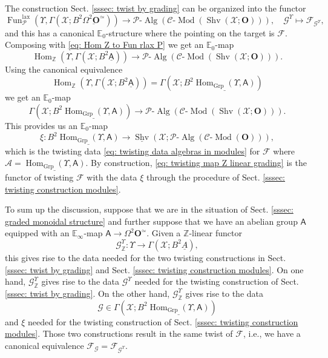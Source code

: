 \documentclass[10pt]{amsart}
\theoremstyle{remark}
\newcommand{\ul}{\underline}
\newcommand{\E}{\mathbb{E}}
\newcommand{\Z}{\mathbb{Z}}
\newcommand{\cP}{\mathcal{P}}
\newcommand{\on}{\operatorname}
\newcommand{\cA}{\mathcal{A}}
\newcommand{\cC}{\mathcal{C}}
\newcommand{\cF}{\mathcal{F}}
\newcommand{\cG}{\mathcal{G}}
\newcommand{\cX}{\mathcal{X}}
\newcommand{\lMod}{\text{-}\on{Mod}}
\newcommand{\lAlg}{\text{-}\on{Alg}}
\newcommand{\Shv}{\on{Shv}}
\DeclareMathOperator{\Hom}{Hom}
\newcommand{\Fun}{\on{Fun}}
\newcommand{\bO}{\mathbf{O}}
\newcommand{\sfA}{\mathsf{A}}
\begin{document}
The construction Sect. \ref{sssec: twist by grading} can be organized into the functor
\[\Fun^{\on{lax}}_{\cP}(\Upsilon, \Gamma(\cX;B^2\ul{\Omega^2\bO^{\simeq}}))\rightarrow \cP\lAlg\left(\cC\lMod\left(\Shv(\cX;\bO)\right)\right),\quad \cG^{\Upsilon}\mapsto \cF_{\cG^{\Upsilon}},\]
and this has a canonical $\E_0$-structure where the pointing on the target is $\cF$. Composing with \eqref{eq: Hom Z to Fun rlax P} we get an $\E_0$-map
\[\Hom_{\Z}(\Upsilon,\Gamma(\cX;B^2\ul{\sfA}))\rightarrow \cP\lAlg\left(\cC\lMod\left(\Shv(\cX;\bO)\right)\right).\]
Using the canonical equivalence
\[\Hom_{\Z}(\Upsilon,\Gamma(\cX; B^2\ul{\sfA}))=\Gamma(\cX;B^2\ul{\Hom_{\on{Grp}}(\Upsilon,\sfA)})\]
we get an $\E_0$-map
\begin{equation}\label{eq: twisting map Z linear grading}
    \Gamma(\cX;B^2\ul{\Hom_{\on{Grp}}(\Upsilon,\sfA)})\rightarrow \cP\lAlg\left(\cC\lMod\left(\Shv(\cX;\bO)\right)\right).
\end{equation}
This provides us an $\E_0$-map
\begin{equation*}
    \xi: B^2\ul{\Hom_{\on{Grp}}(\Upsilon,\sfA)}\rightarrow\ul{\Shv}\left(\cX;\cP\lAlg\left(\cC\lMod(\bO)\right)\right),
\end{equation*}
which is the twisting data \eqref{eq: twisting data algebras in modules} for $\cF$ where $\cA=\ul{\Hom_{\on{Grp}}(\Upsilon,\sfA)}$. By construction, \eqref{eq: twisting map Z linear grading} is the functor of twisting $\cF$ with the data $\xi$ through the procedure of Sect. \ref{sssec: twisting construction modules}.
\medskip

To sum up the discussion, suppose that we are in the situation of Sect. \ref{sssec: graded monoidal structure} and further suppose that we have an abelian group $\sfA$ equipped with an $\E_{\infty}$-map $\sfA\rightarrow\Omega^2\bO^{\simeq}$. Given a $\Z$-linear functor
\begin{equation}\label{eq: Z linear Upsilon family}
    \cG^{\Upsilon}_{\Z}:\Upsilon\rightarrow \Gamma(\cX;B^2\ul{A}),
\end{equation}
this gives rise to the data needed for the two twisting constructions in Sect. \ref{sssec: twist by grading} and Sect. \ref{sssec: twisting construction modules}. On one hand, $\cG^{\Upsilon}_{\Z}$ gives rise to the data $\cG^{\Upsilon}$ needed for the twisting construction of Sect. \ref{sssec: twist by grading}. On the other hand,  $\cG^{\Upsilon}_{\Z}$ gives rise to the data 
\begin{equation}\label{eq: formation of cG}
    \cG\in\Gamma(\cX;B^2\ul{\Hom_{\on{Grp}}(\Upsilon,\sfA)})
\end{equation}
and $\xi$ needed for the twisting construction of Sect. \ref{sssec: twisting construction modules}. Those two constructions result in the same twist of $\cF$, i.e., we have a canonical equivalence
$\cF_{\cG}=\cF_{\cG^{\Upsilon}}$.
\end{document}

